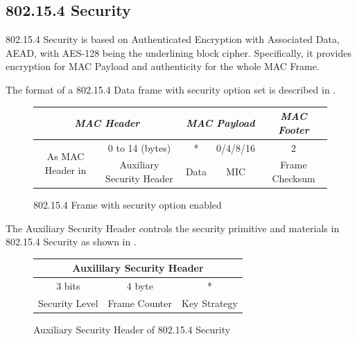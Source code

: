 \subsection{802.15.4 Security} \label{Subsec: 802154 Sec}
802.15.4 Security is based on Authenticated Encryption with Associated Data, AEAD, with AES-128 being the underlining block cipher. Specifically, it provides encryption for MAC Payload and authenticity for the whole MAC Frame.

The format of a 802.15.4 Data frame with security option set is described in .

\begin{figure}[h!]
	\centering
	\begin{tabular}{|c|c|c|c|c|c|c|}
		\multicolumn{4}{c}{\textit{MAC Header}}                                                             & \multicolumn{2}{c}{\textit{MAC Payload}} & \multicolumn{1}{c}{\textit{MAC Footer}}     \\ \hline
		\multicolumn{3}{|c|}{\multirow{2}{*}{As MAC Header in \Cref{Fig: 802154 Data Frame}}} & 0 to 14 (bytes)                    & *             & 0/4/8/16         & 2              \\ \cline{4-7} 
		\multicolumn{3}{|c|}{}                                           & Auxiliary Security Header & Data          & MIC              & Frame Checksum \\ \hline
	\end{tabular}
	\caption{802.15.4 Frame with security option enabled} \label{Fig: 802154 sec frame}
\end{figure}

The Auxiliary Security Header controls the security primitive and materials in 802.15.4 Security as shown in .

\begin{figure}[h!]
	\center
	\begin{tabular}{|c|c|c|}
	\hline
	\multicolumn{3}{|c|}{Auxililary Security Header} \\ \hline
	3 bits          & 4 byte         & *             \\ \hline
	Security Level  & Frame Counter  & Key Strategy  \\ \hline
	\end{tabular}
	\caption{Auxiliary Security Header of 802.15.4 Security}
	\label{Fig: Auxiliary Security Header of 802.15.4 Security}
\end{figure}


